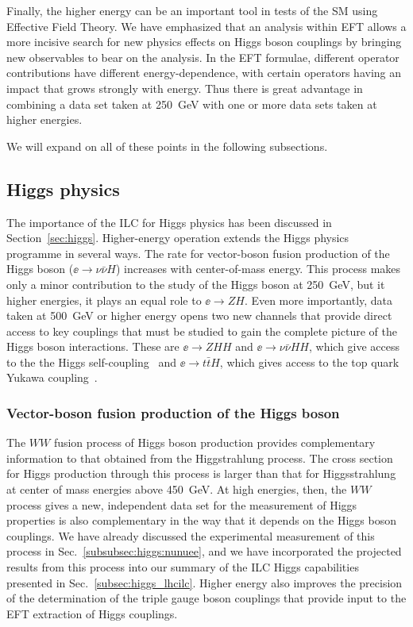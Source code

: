 Finally, the higher energy can be an important tool in tests of the SM
using Effective Field Theory.   We have emphasized that an analysis
within  EFT allows a more incisive search for new physics effects on
Higgs boson couplings by bringing new observables to bear on  the
analysis.  In the EFT formulae, different operator contributions have different
energy-dependence, with certain operators having an impact that grows 
strongly with energy.  Thus there is great advantage in combining a
data set taken at 250~GeV with one or more data sets taken at higher
energies.

We will expand on all of these points in the following subsections.




\subsection{Higgs physics}
\label{subsec:highE:Higgs}

The importance of the ILC for Higgs physics has been discussed in
Section~\ref{sec:higgs}.
Higher-energy operation extends the Higgs physics programme in several
ways.
The rate for vector-boson fusion production of the Higgs boson
($\ee\to \nu\bar\nu H$)  increases with
center-of-mass energy.  This process makes only a minor contribution 
to the study of the Higgs boson at 250~GeV, but it higher energies, it
plays an equal role to $\ee \to ZH$.  Even more importantly, data taken
at 500~GeV or higher energy opens two new channels that provide direct
access to key couplings that must be studied to gain the complete
picture of the Higgs boson interactions.  These are $\ee \to ZHH$ and
$\ee\to \nu\bar \nu HH$, which give access to the the Higgs 
self-coupling~\cite{Barklow:2017awn}
and $\ee\to t\bar t H$, which gives access to the top quark
 Yukawa coupling~\cite{Yonamine:2011jg}.

\subsubsection{Vector-boson fusion production of the Higgs boson}
\label{subsubsec:highE:VBFHiggs}

The $WW$ fusion process of Higgs boson production provides
complementary information to that obtained from the Higgstrahlung
process.  The cross section for Higgs production through this process
is larger than that for Higgsstrahlung at center of mass energies
above
450~GeV.   At high energies, then, the $WW$ process gives a new, independent data set
for the measurement of Higgs properties is also complementary in the way that it
depends on the Higgs boson couplings.  We have already discussed the
experimental
measurement of this process in Sec.~\ref{subsubsec:higgs:nunuee}, and
we have incorporated the projected results from this process into our
summary of the ILC Higgs capabilities presented in Sec.~\ref{subsec:higgs_lhcilc}.
Higher energy also improves the precision of the determination of the
triple gauge boson couplings that provide input to the EFT extraction
of Higgs couplings. 

